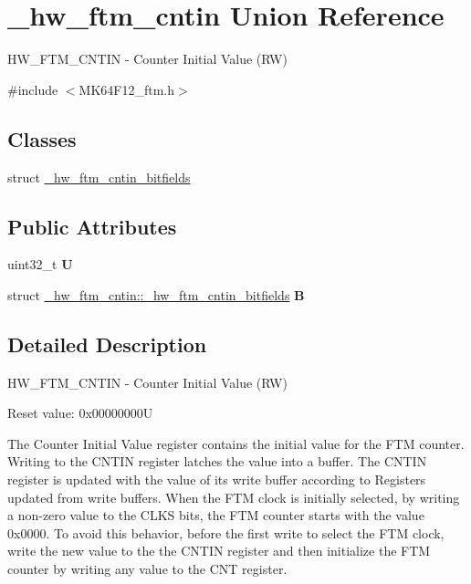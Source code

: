 \hypertarget{union__hw__ftm__cntin}{}\section{\+\_\+hw\+\_\+ftm\+\_\+cntin Union Reference}
\label{union__hw__ftm__cntin}


H\+W\+\_\+\+F\+T\+M\+\_\+\+C\+N\+T\+IN -\/ Counter Initial Value (RW)  




{\ttfamily \#include $<$M\+K64\+F12\+\_\+ftm.\+h$>$}

\subsection*{Classes}
\begin{DoxyCompactItemize}
\item 
struct \hyperlink{struct__hw__ftm__cntin_1_1__hw__ftm__cntin__bitfields}{\+\_\+hw\+\_\+ftm\+\_\+cntin\+\_\+bitfields}
\end{DoxyCompactItemize}
\subsection*{Public Attributes}
\begin{DoxyCompactItemize}
\item 
uint32\+\_\+t {\bfseries U}\hypertarget{union__hw__ftm__cntin_ae532da2fc29b87dc4c18ef038aa3f3ed}{}\label{union__hw__ftm__cntin_ae532da2fc29b87dc4c18ef038aa3f3ed}

\item 
struct \hyperlink{struct__hw__ftm__cntin_1_1__hw__ftm__cntin__bitfields}{\+\_\+hw\+\_\+ftm\+\_\+cntin\+::\+\_\+hw\+\_\+ftm\+\_\+cntin\+\_\+bitfields} {\bfseries B}\hypertarget{union__hw__ftm__cntin_a221225d42ecc0e1b28dd648dc400f213}{}\label{union__hw__ftm__cntin_a221225d42ecc0e1b28dd648dc400f213}

\end{DoxyCompactItemize}


\subsection{Detailed Description}
H\+W\+\_\+\+F\+T\+M\+\_\+\+C\+N\+T\+IN -\/ Counter Initial Value (RW) 

Reset value\+: 0x00000000U

The Counter Initial Value register contains the initial value for the F\+TM counter. Writing to the C\+N\+T\+IN register latches the value into a buffer. The C\+N\+T\+IN register is updated with the value of its write buffer according to Registers updated from write buffers. When the F\+TM clock is initially selected, by writing a non-\/zero value to the C\+L\+KS bits, the F\+TM counter starts with the value 0x0000. To avoid this behavior, before the first write to select the F\+TM clock, write the new value to the the C\+N\+T\+IN register and then initialize the F\+TM counter by writing any value to the C\+NT register. 

